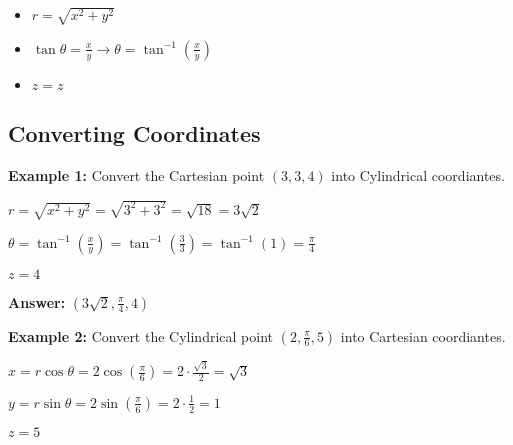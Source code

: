 \documentclass[10pt]{article}                               %
\begin{document}
\begin{adjustwidth}{2em}{0pt}
\begin{adjustwidth}{2em}{0pt}
        \begin{itemize}
            \item \( r = \sqrt{x^2 + y^2} \)
            \item \( \tan\theta = \frac{x}{y}  \rightarrow  \theta = \tan^{-1}\left(\frac{x}{y}\right) \)
            \item \( z = z \)
        \end{itemize}

        \begin{examplebox}

            \subsection*{Converting Coordinates}
        
            \textbf{Example 1:} Convert the Cartesian point \( \left(3,3,4\right) \) into Cylindrical coordiantes.
            \vspace{0.5em}

            \begin{adjustwidth}{2em}{0pt}

                \( r = \sqrt{x^2 + y^2} = \sqrt{3^2 + 3^2} = \sqrt{18} = 3\sqrt{2} \)

                \( \theta = \tan^{-1}\left(\frac{x}{y}\right) = \tan^{-1}\left(\frac{3}{3}\right) = \tan^{-1}(1) = \frac{\pi}{4} \)

                \( z = 4 \)

                \textbf{Answer:} \( \left(3\sqrt{2}, \frac{\pi}{4}, 4\right) \)

            \end{adjustwidth}

            \vspace{1em}

            \textbf{Example 2:} Convert the Cylindrical point \( \left(2, \frac{\pi}{6}, 5\right) \) into Cartesian coordiantes.
            \vspace{0.5em}

            \begin{adjustwidth}{2em}{0pt}

                \( x = r\cos\theta = 2\cos\left(\frac{\pi}{6}\right) = 2 \cdot \frac{\sqrt{3}}{2} = \sqrt{3} \)

                \( y = r\sin\theta = 2\sin\left(\frac{\pi}{6}\right) = 2 \cdot \frac{1}{2} = 1 \)

                \( z = 5 \)


\end{adjustwidth}
\end{examplebox}
\end{adjustwidth}
\end{adjustwidth}
\end{document}
